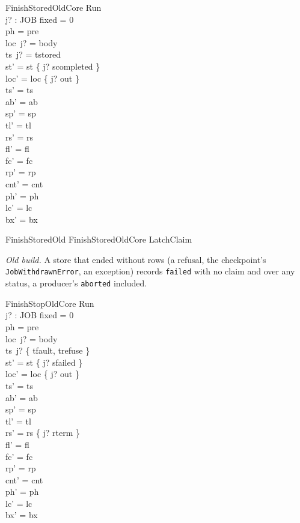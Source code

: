 \documentclass[a4paper,10pt,fleqn]{article}
\newcommand{\field}[1]{\texttt{#1}}
\begin{document}
\begin{schema}{FinishStoredOldCore}
\Delta Run \\ j? : JOB
\where
fixed = 0 \\
ph = pre \\
loc~j? = body \\
ts~j? = tstored \\
st' = st \oplus \{ j? \mapsto scompleted \} \\
loc' = loc \oplus \{ j? \mapsto out \} \\
ts' = ts \\
ab' = ab \\
sp' = sp \\
tl' = tl \\
rs' = rs \\
fl' = fl \\
fc' = fc \\
rp' = rp \\
cnt' = cnt \\
ph' = ph \\
lc' = lc \\
bx' = bx
\end{schema}

\begin{zed}
FinishStoredOld  FinishStoredOldCore \land LatchClaim
\end{zed}

\emph{Old build.} A store that ended without rows (a refusal, the checkpoint's
\field{JobWithdrawnError}, an exception) records \field{failed} with no claim
and over any status, a producer's \field{aborted} included.

\begin{schema}{FinishStopOldCore}
\Delta Run \\ j? : JOB
\where
fixed = 0 \\
ph = pre \\
loc~j? = body \\
ts~j? \in \{ tfault, trefuse \} \\
st' = st \oplus \{ j? \mapsto sfailed \} \\
loc' = loc \oplus \{ j? \mapsto out \} \\
ts' = ts \\
ab' = ab \\
sp' = sp \\
tl' = tl \\
rs' = rs \oplus \{ j? \mapsto rterm \} \\
fl' = fl \\
fc' = fc \\
rp' = rp \\
cnt' = cnt \\
ph' = ph \\
lc' = lc \\
bx' = bx
\end{schema}
\end{document}
